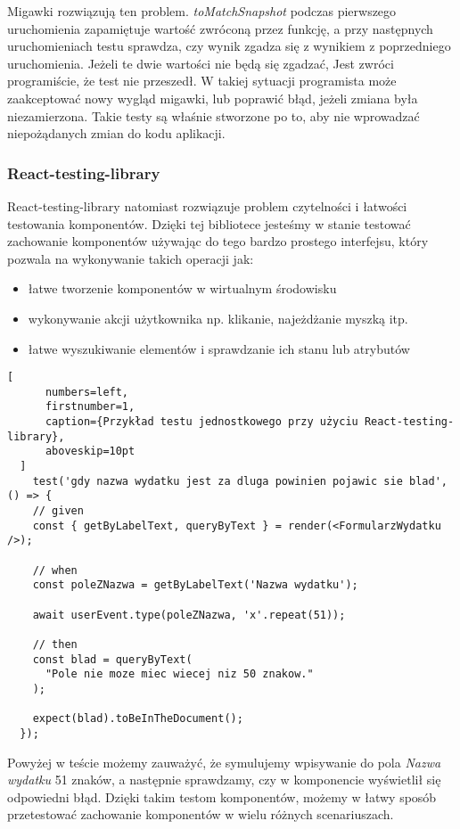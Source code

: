 \begin{description}
  Migawki rozwiązują ten problem. \emph{toMatchSnapshot} podczas pierwszego uruchomienia zapamiętuje wartość zwróconą przez funkcję, a przy następnych uruchomieniach testu sprawdza, czy wynik zgadza się z wynikiem z poprzedniego uruchomienia. Jeżeli te dwie wartości nie będą się zgadzać, Jest zwróci programiście, że test nie przeszedł. W takiej sytuacji programista może zaakceptować nowy wygląd migawki, lub poprawić błąd, jeżeli zmiana była niezamierzona. Takie testy są właśnie stworzone po to, aby nie wprowadzać niepożądanych zmian do kodu aplikacji.

\subsubsection{React-testing-library} React-testing-library natomiast rozwiązuje problem czytelności i łatwości testowania komponentów. Dzięki tej bibliotece jesteśmy w stanie testować zachowanie komponentów używając do tego bardzo prostego interfejsu, który pozwala na wykonywanie takich operacji jak:
\begin{itemize}
  \item łatwe tworzenie komponentów w wirtualnym środowisku
  \item wykonywanie akcji użytkownika np. klikanie, najeżdżanie myszką itp.
  \item łatwe wyszukiwanie elementów i sprawdzanie ich stanu lub atrybutów
\end{itemize}


\end{description}
  \begin{addmargin}[6mm]{0mm}
  \begin{lstlisting}[
      numbers=left,
      firstnumber=1,
      caption={Przykład testu jednostkowego przy użyciu React-testing-library},
      aboveskip=10pt
  ]
    test('gdy nazwa wydatku jest za dluga powinien pojawic sie blad', () => {
    // given
    const { getByLabelText, queryByText } = render(<FormularzWydatku />);

    // when
    const poleZNazwa = getByLabelText('Nazwa wydatku');

    await userEvent.type(poleZNazwa, 'x'.repeat(51));

    // then
    const blad = queryByText(
      "Pole nie moze miec wiecej niz 50 znakow."
    );

    expect(blad).toBeInTheDocument();
  });
  \end{lstlisting}
  \end{addmargin}
  Powyżej w teście możemy zauważyć, że symulujemy wpisywanie do pola \emph{Nazwa wydatku} 51 znaków, a następnie sprawdzamy, czy w komponencie wyświetlił się odpowiedni błąd. Dzięki takim testom komponentów, możemy w łatwy sposób przetestować zachowanie komponentów w wielu różnych scenariuszach.

